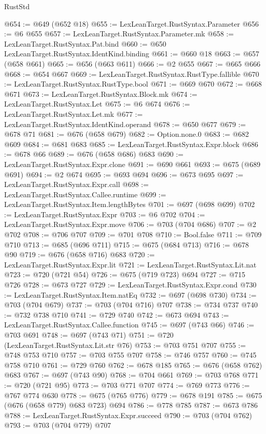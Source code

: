 \begin{lexlean}{RustStd}
\begin{coremodule}
@654 := @649 (@652 @18)
@655 := LexLeanTarget.RustSyntax.Parameter
@656 := @6 @655
@657 := LexLeanTarget.RustSyntax.Parameter.mk
@658 := LexLeanTarget.RustSyntax.Pat.bind
@660 := @650 LexLeanTarget.RustSyntax.IdentKind.binding
@661 := @660 @18
@663 := @657 (@658 @661)
@665 := @656 (@663 @611)
@666 := @2 @655
@667 := @665 @666
@668 := @654 @667
@669 := LexLeanTarget.RustSyntax.RustType.fallible
@670 := LexLeanTarget.RustSyntax.RustType.bool
@671 := @669 @670
@672 := @668 @671
@673 := LexLeanTarget.RustSyntax.Block.mk
@674 := LexLeanTarget.RustSyntax.Let
@675 := @6 @674
@676 := LexLeanTarget.RustSyntax.Let.mk
@677 := LexLeanTarget.RustSyntax.IdentKind.operand
@678 := @650 @677
@679 := @678 @71
@681 := @676 (@658 @679)
@682 := Option.none.{0}
@683 := @682 @609
@684 := @681 @683
@685 := LexLeanTarget.RustSyntax.Expr.block
@686 := @678 @66
@689 := @676 (@658 @686) @683
@690 := LexLeanTarget.RustSyntax.Expr.clone
@691 := @690 @661
@693 := @675 (@689 @691)
@694 := @2 @674
@695 := @693 @694
@696 := @673 @695
@697 := LexLeanTarget.RustSyntax.Expr.call
@698 := LexLeanTarget.RustSyntax.Callee.runtime
@699 := LexLeanTarget.RustSyntax.Item.lengthBytes
@701 := @697 (@698 @699)
@702 := LexLeanTarget.RustSyntax.Expr
@703 := @6 @702
@704 := LexLeanTarget.RustSyntax.Expr.move
@706 := @703 (@704 @686)
@707 := @2 @702
@708 := @706 @707
@709 := @701 @708
@710 := Bool.false
@711 := @709 @710
@713 := @685 (@696 @711)
@715 := @675 (@684 @713)
@716 := @678 @90
@719 := @676 (@658 @716) @683
@720 := LexLeanTarget.RustSyntax.Expr.lit
@721 := LexLeanTarget.RustSyntax.Lit.nat
@723 := @720 (@721 @54)
@726 := @675 (@719 @723) @694
@727 := @715 @726
@728 := @673 @727
@729 := LexLeanTarget.RustSyntax.Expr.cond
@730 := LexLeanTarget.RustSyntax.Item.natEq
@732 := @697 (@698 @730)
@734 := @703 (@704 @679)
@737 := @703 (@704 @716) @707
@738 := @734 @737
@740 := @732 @738 @710
@741 := @729 @740
@742 := @673 @694
@743 := LexLeanTarget.RustSyntax.Callee.function
@745 := @697 (@743 @66)
@746 := @703 @691
@748 := @697 (@743 @71)
@751 := @720 (LexLeanTarget.RustSyntax.Lit.str @76)
@753 := @703 @751 @707
@755 := @748 @753 @710
@757 := @703 @755 @707
@758 := @746 @757
@760 := @745 @758 @710
@761 := @729 @760
@762 := @678 @185
@765 := @676 (@658 @762) @683
@767 := @697 (@743 @90)
@768 := @704 @661
@769 := @703 @768
@771 := @720 (@721 @95)
@773 := @703 @771 @707
@774 := @769 @773
@776 := @767 @774 @630
@778 := @675 (@765 @776)
@779 := @678 @191
@785 := @675 (@676 (@658 @779) @683 @723) @694
@786 := @778 @785
@787 := @673 @786
@788 := LexLeanTarget.RustSyntax.Expr.succeed
@790 := @703 (@704 @762)
@793 := @703 (@704 @779) @707

\end{coremodule}
\end{lexlean}
